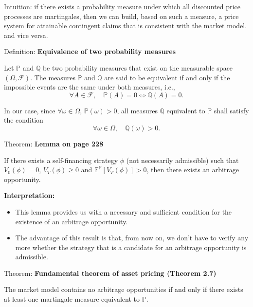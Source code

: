 \documentclass[12pt,a4paper]{article}
\begin{document}
Intuition: if there exists a probability measure under
which all discounted price processes are martingales, then we
can build, based on such a measure, a price system for
attainable contingent claims that is consistent with the market
model. and vice versa.
\vspace{1em}

Definition: \textbf{Equivalence of two probability measures}
\vspace{0.5em}

Let $\mathbb{P}$ and $\mathbb{Q}$ be two probability measures that exist on the measurable space $(\Omega, \mathcal{F})$. The measures $\mathbb{P}$ and $\mathbb{Q}$ are said to be equivalent if and only if the impossible events are the same under both measures, i.e.,
\[
\forall A \in \mathcal{F}, \quad \mathbb{P}(A) = 0 \Leftrightarrow \mathbb{Q}(A) = 0.
\]

In our case, since $\forall \omega \in \Omega$, $\mathbb{P}(\omega) > 0$, all measures $\mathbb{Q}$ equivalent to $\mathbb{P}$ shall satisfy the condition
\[
\forall \omega \in \Omega, \quad \mathbb{Q}(\omega) > 0.
\]
\vspace{1em}

Theorem: \textbf{Lemma on page 228}
\vspace{0.5em}

If there exists a self-financing strategy $\phi$ (not necessarily admissible) such that $V_0(\phi) = 0$, $V_T(\phi) \geq 0$ and $\mathbb{E}^{\mathbb{P}}[V_T(\phi)] > 0$, then there exists an arbitrage opportunity.

\textbf{Interpretation:}
\begin{itemize}
	\item This lemma provides us with a necessary and sufficient condition for the existence of an arbitrage opportunity.
	\item The advantage of this result is that, from now on, we don't have to verify any more whether the strategy that is a candidate for an arbitrage opportunity is admissible.
\end{itemize}
\vspace{1em}

Theorem: \textbf{Fundamental theorem of asset pricing (Theorem 2.7)}
\vspace{0.5em}

The market model contains no arbitrage opportunities if and only if there exists at least one martingale measure equivalent to $\mathbb{P}$.
\vspace{1em}
\end{document}
